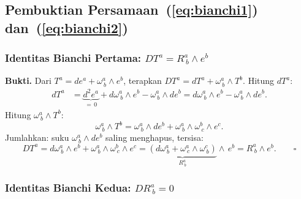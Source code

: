  
\subsection{Pembuktian Persamaan~(\ref{eq:bianchi1}) dan~(\ref{eq:bianchi2})}
\label{app:proof-bianchi}
 
\subsubsection{Identitas Bianchi Pertama: $DT^a = R^a_{\ b} \wedge e^b$}
 
\noindent\textbf{Bukti.} Dari $T^a = de^a + \omega^a_{\ b} \wedge e^b$, terapkan $DT^a = dT^a + \omega^a_{\ b} \wedge T^b$. Hitung $dT^a$:
\begin{align}
    dT^a &= \underbrace{d^2e^a}_{=\,0} + d\omega^a_{\ b} \wedge e^b - \omega^a_{\ b} \wedge de^b
    = d\omega^a_{\ b} \wedge e^b - \omega^a_{\ b} \wedge de^b.
\end{align}
Hitung $\omega^a_{\ b} \wedge T^b$:
\begin{equation}
    \omega^a_{\ b} \wedge T^b = \omega^a_{\ b} \wedge de^b + \omega^a_{\ b} \wedge \omega^b_{\ c} \wedge e^c.
\end{equation}
Jumlahkan: suku $\omega^a_{\ b} \wedge de^b$ saling menghapus, tersisa:
\begin{equation}
    DT^a = d\omega^a_{\ b} \wedge e^b + \omega^a_{\ b} \wedge \omega^b_{\ c} \wedge e^c = \underbrace{(d\omega^a_{\ b} + \omega^a_{\ c} \wedge \omega^c_{\ b})}_{R^a_{\ b}} \wedge\, e^b = R^a_{\ b} \wedge e^b. \qquad\square
\end{equation}
 
\subsubsection{Identitas Bianchi Kedua: $DR^a_{\ b} = 0$}
 
